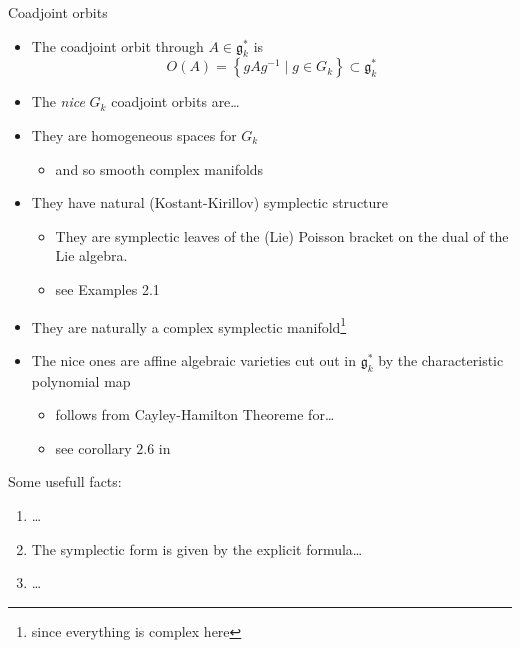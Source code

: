 \begin{frame}[t]{Coadjoint orbits}
  \begin{defn}
    \begin{itemize}
      \item The coadjoint orbit through $A\in\mathfrak{g}_k^*$ is
        \[
          O(A)=\left\{gAg^{-1}\mid g\in G_k\right\}\subset\mathfrak{g}_k^*
        \]
      \item The \emph{nice} $G_k$ coadjoint orbits are\dots
    \end{itemize}
  \end{defn}
  \begin{itemize}
    \item They are homogeneous spaces for $G_k$
    \begin{itemize}
      \item and so smooth complex manifolds
    \end{itemize}
    \item They have natural (Kostant-Kirillov) symplectic structure
    \begin{itemize}
      \item They are symplectic leaves of the (Lie) Poisson bracket on the dual
      of the Lie algebra.
    \item see \cite{citeulike:4402830} Examples 2.1
    \end{itemize}
    \item They are naturally a complex symplectic manifold\footnote{since
    everything is complex here}
    \item The nice ones are affine algebraic varieties cut out in
    $\mathfrak{g}_k^*$ by the characteristic polynomial map
    \begin{itemize}
      \item follows from Cayley-Hamilton Theoreme for\dots
      \item see corollary $2.6$ in \cite{thboalch}
    \end{itemize}
  \end{itemize}
  Some usefull facts:
  \begin{lem}
    \begin{enumerate}
      \item\dots
      \item The symplectic form is given by the explicit formula\dots
      \item\dots
    \end{enumerate}
  \end{lem}
\end{frame}

